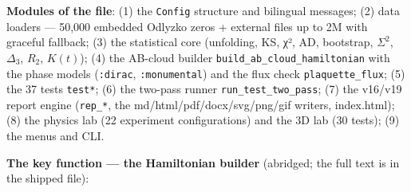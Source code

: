\documentclass[
]{article}
\begin{document}
\textbf{Modules of the file}: (1) the \texttt{Config} structure and
bilingual messages; (2) data loaders --- 50,000 embedded Odlyzko zeros +
external files up to 2M with graceful fallback; (3) the statistical core
(unfolding, KS, χ², AD, bootstrap, \(\Sigma^2\), \(\Delta_3\), \(R_2\),
\(K(t)\)); (4) the AB-cloud builder
\texttt{build\_ab\_cloud\_hamiltonian} with the phase models
(\texttt{:dirac}, \texttt{:monumental}) and the flux check
\texttt{plaquette\_flux}; (5) the 37 tests \texttt{test*}; (6) the
two-pass runner \texttt{run\_test\_two\_pass}; (7) the v16/v19 report
engine (\texttt{rep\_*}, the md/html/pdf/docx/svg/png/gif writers,
index.html); (8) the physics lab (22 experiment configurations) and the
3D lab (30 tests); (9) the menus and CLI.

\textbf{The key function --- the Hamiltonian builder} (abridged; the
full text is in the shipped file):
\end{document}
